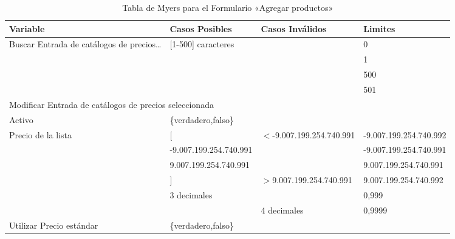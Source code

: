 \begin{table}[H]
\centering
\begin{tabular}{|p{3.0cm}|p{4.0cm}|p{4.0cm}|l|}
\hline
\footnotesize{\textbf{Variable}} & \footnotesize{\textbf{Casos Posibles}} & \footnotesize{\textbf{Casos Inválidos}} & \footnotesize{\textbf{Limites}} \\
\hline
\footnotesize{Buscar Entrada de catálogos de precios\ldots} & \footnotesize{[1-500] caracteres} & & \footnotesize{0} \\
& & & \footnotesize{1} \\
& & & \footnotesize{500} \\
& & & \footnotesize{501} \\
\hline
\multicolumn{4}{|l|}{\footnotesize{Modificar Entrada de catálogos de precios seleccionada}} \\
\hline
\footnotesize{Activo} & \footnotesize{\{verdadero,falso\}} & & \\
\hline
\footnotesize{Precio de la lista} & \footnotesize{[} & \footnotesize{$<$-9.007.199.254.740.991} & \footnotesize{-9.007.199.254.740.992} \\
& \footnotesize{-9.007.199.254.740.991} & & \footnotesize{-9.007.199.254.740.991} \\
& \footnotesize{9.007.199.254.740.991} & & \footnotesize{9.007.199.254.740.991} \\
& \footnotesize{]} & \footnotesize{$>$9.007.199.254.740.991} & \footnotesize{9.007.199.254.740.992} \\
& \footnotesize{3 decimales} & & \footnotesize{0,999} \\
& & \footnotesize{4 decimales} & \footnotesize{0,9999} \\
\hline
\footnotesize{Utilizar Precio estándar} & \footnotesize{\{verdadero,falso\}} & & \\
\hline
\end{tabular}
\caption{Tabla de Myers para el Formulario «Agregar productos»}
\label{myers_06}
\end{table}

